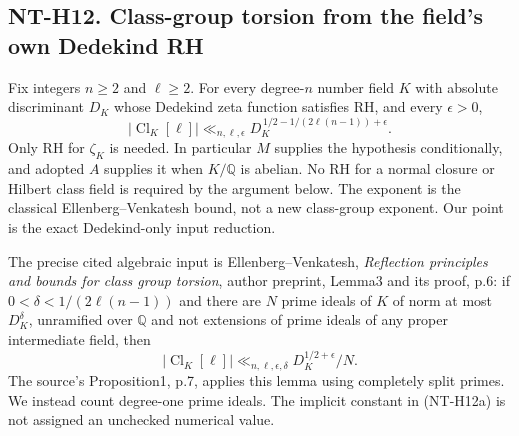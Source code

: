 \documentclass[11pt,a4paper]{article}
\begin{document}
\subsection*{NT-H12. Class-group torsion from the field's own Dedekind RH}
Fix integers $n\ge2$ and $\ell\ge2$. For every degree-$n$ number field
$K$ with absolute discriminant $D_K$ whose Dedekind zeta function satisfies
RH, and every $\epsilon>0$,
\[
 |\operatorname{Cl}_K[\ell]|
       \ll_{n,\ell,\epsilon}
 D_K^{\,1/2-1/(2\ell(n-1))+\epsilon}.                   \tag{NT-H12a}
\]
Only RH for $\zeta_K$ is needed. In particular $M$ supplies the hypothesis
conditionally, and adopted $A$ supplies it when $K/\mathbb Q$ is abelian.
No RH for a normal closure or Hilbert class field is required by the
argument below. The exponent is the classical Ellenberg--Venkatesh
bound, not a new class-group exponent. Our point is the exact
Dedekind-only input reduction.

The precise cited algebraic input is Ellenberg--Venkatesh,
\emph{Reflection principles and bounds for class group torsion},
author preprint, Lemma3 and its proof, p.6: if
$0<\delta<1/(2\ell(n-1))$ and there are $N$ prime ideals of $K$
of norm at most $D_K^\delta$, unramified over $\mathbb Q$ and not
extensions of prime ideals of any proper intermediate field, then
\[
 |\operatorname{Cl}_K[\ell]|
       \ll_{n,\ell,\epsilon,\delta}D_K^{1/2+\epsilon}/N.
                                                        \tag{NT-H12b}
\]
The source's Proposition1, p.7, applies this lemma using completely
split primes. We instead count degree-one prime ideals. The implicit
constant in (NT-H12a) is not assigned an unchecked numerical value.
\end{document}
